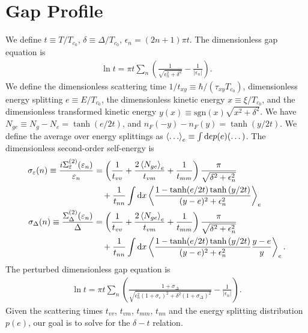 \documentclass[aps,prl,preprint]{revtex4-2}
\begin{document}
\section{Gap Profile}

We define $t \equiv T/T_{c_0}$, $\delta \equiv \Delta/T_{c_0}$, $\epsilon_n = (2n + 1)\pi t$.
The dimensionless gap equation is
\begin{align}
    \ln{t} = \pi t\sum_n\left(\frac{1}{\sqrt{\epsilon_n^2 + \delta^2}} - \frac{1}{|\epsilon_n|}\right).
\end{align}
We define the dimensionless scattering time $1/t_{xy} \equiv \hbar/(\tau_{xy}T_{c_0})$,
dimensionless energy splitting $e \equiv E/T_{c_0}$,
the dimensionless kinetic energy $x \equiv \xi/T_{c_0}$,
and the dimensionless transformed kinetic energy $y(x) \equiv \text{sgn}(x)\sqrt{x^2 + \delta^2}$.
We have $N_{ge} \equiv N_g - N_e = \tanh(e/2t)$, and $n_F(-y) - n_F(y) = \tanh(y/2t)$.
We define the average over energy splittings as $\ev{\dots}_e \equiv \int\dd e p(e)(\dots)$.
The dimensionless second-order self-energy is
\begin{align}
    \sigma_\varepsilon(n) \equiv \frac{i\Sigma^{(2)}_\varepsilon(\varepsilon_n)}{\varepsilon_n} & = \left(\frac{1}{t_{vv}} + \frac{2\ev{N_{ge}}_e}{t_{vm}} + \frac{1}{t_{mm}}\right)\frac{\pi}{\sqrt{\delta^2+\epsilon_n^2}}   \nonumber \\
                                                                                                & \quad + \frac{1}{t_{nn}}\int\dd x\ev{\frac{1-\tanh(e/2t)\tanh{(y/2t)}}{(y-e)^2 + \epsilon_n^2}}_e                                      \\
    \sigma_\Delta(n) \equiv \frac{\Sigma^{(2)}_\Delta(\varepsilon_n)}{\Delta}                   & = \left(\frac{1}{t_{vv}} + \frac{2\ev{N_{ge}}_e}{t_{vm}} + \frac{1}{t_{mm}}\right)\frac{\pi}{\sqrt{\delta^2+\epsilon_n^2}}   \nonumber \\
                                                                                                & \quad + \frac{1}{t_{nn}}\int\dd x\ev{\frac{1-\tanh(e/2t)\tanh{(y/2t)}}{(y-e)^2 + \epsilon_n^2}\frac{y-e}{y}}_e.
\end{align}
The perturbed dimensionless gap equation is
\begin{align}
    \ln{t} = \pi t \sum_n\left(\frac{1 + \sigma_\Delta}{\sqrt{\epsilon_n^2(1 + \sigma_\varepsilon)^2 + \delta^2(1 + \sigma_\Delta)^2}} - \frac{1}{|\epsilon_n|}\right).
\end{align}
Given the scattering times $t_{vv}$, $t_{vm}$, $t_{mm}$, $t_{nn}$ and the energy splitting distribution $p(e)$, our goal is to solve for the $\delta - t$ relation.
\end{document}
